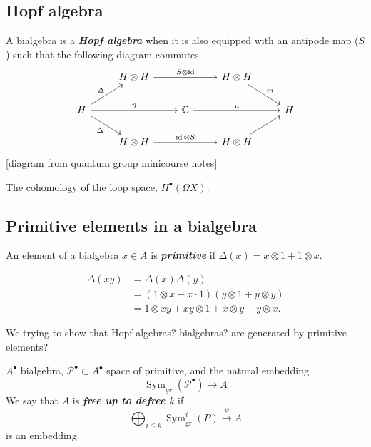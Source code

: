 \subsection{Hopf algebra}

\begin{defn}
	A bialgebra is a \textit{\textbf{Hopf algebra}} when it is also equipped with an antipode map ($S$) such that the following diagram commutes
\[\begin{tikzcd}
	&H\otimes H\arrow[rr,"S\otimes \operatorname{id}"]&&H\otimes H\arrow[rd,"m"]\\
	H\arrow[ur,"\Delta"]\arrow[dr,swap,"\Delta"]\arrow[rr,"\eta"]&&\mathbb{C}\arrow[rr,"u"]&&H\\
								     &H\otimes H\arrow[rr,"\operatorname{id}\otimes S"]&&H\otimes H\arrow[ur]
\end{tikzcd}\]
[diagram from quantum group minicourse notes]

	\end{defn}

\begin{example}
	The cohomology of the loop space, $H^{\bullet}(\Omega X)$.
\end{example}

\subsection{Primitive elements in a bialgebra}

\begin{defn}
	An element of a bialgebra $x\in A$ is \textit{\textbf{primitive}} if $\Delta(x)=x\otimes 1+1\otimes x$.
\end{defn}

\begin{align*}
	\Delta(xy)&=\Delta(x)\Delta(y)\\
	&=(1\otimes x+x\cdot 1)(y\otimes 1+y\otimes y)\\
	&=1\otimes xy+xy\otimes 1+x\otimes y+y\otimes x.
\end{align*}

\begin{remark}
	We trying to show that Hopf algebras? bialgebras? are generated by primitive elements?
\end{remark}

\begin{defn}
	$A^\bullet$ bialgebra, $\mathcal{P}^\bullet\subset A^\bullet$ space of primitive, and the natural embedding
	\[\operatorname{Sym}_{gr}(\mathcal{P}^\bullet)\to A\]
	We say that $A$ is \textit{\textbf{free up to defree $k$}} if
	\[\bigoplus_{i\leq k} \operatorname{Sym}_{\operatorname{gr}}^i(P)\overset{\psi}{\longrightarrow} A\]
	is an embedding.
\end{defn}

